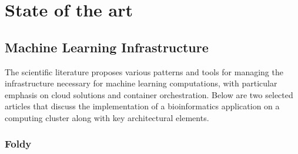 

\chapter{State of the art}


\section{Machine Learning Infrastructure}

The scientific literature proposes various patterns and tools for managing the infrastructure necessary for machine learning computations, with particular emphasis on cloud solutions and container orchestration.
Below are two selected articles that discuss the implementation of a bioinformatics application on a computing cluster along with key architectural elements.

\subsection{Foldy}

